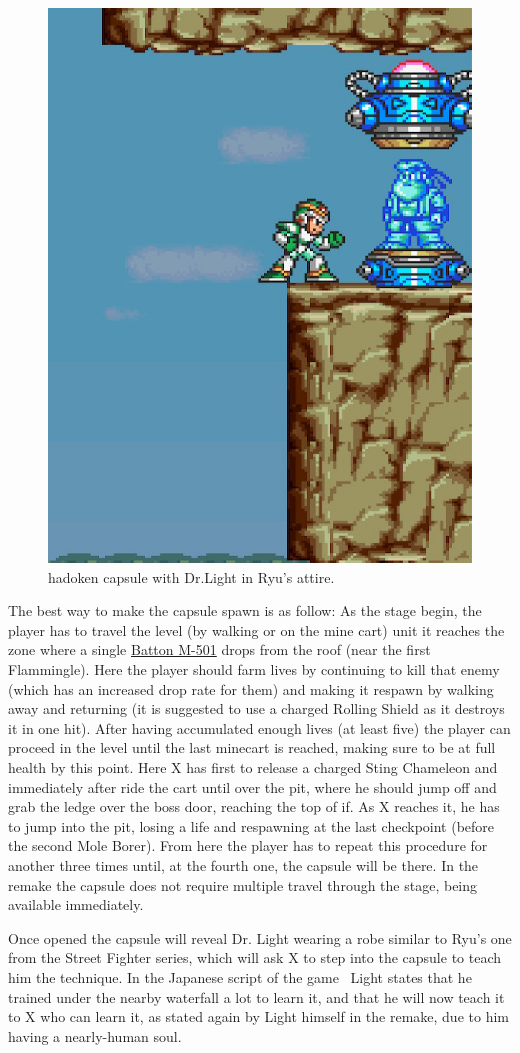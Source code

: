 \begin{figure}[htp]
	\centering
	\includegraphics[width=0.3\linewidth]{figures/X1/Armored_armadillo/Armadillo_hadoken.jpg}
	\caption{hadoken capsule with Dr.Light in Ryu's attire.}
\end{figure}
The best way to make the capsule spawn is as follow: As the stage begin, the player has to travel the level (by walking or on the mine cart) unit it reaches the zone where a single \hyperlink{enem:Batton_M-501}{Batton M-501} drops from the roof (near the first Flammingle). Here the player should farm lives by continuing to kill that enemy (which has an increased drop rate for them)  and making it respawn by walking away and returning (it is suggested to use a charged Rolling Shield as it destroys it in one hit). After having accumulated enough lives (at least five) the player can proceed in the level until the last minecart is reached, making sure to be at full health by this point. Here X has first to release a charged Sting Chameleon and immediately after ride the cart until over the pit, where he should jump off and grab the ledge over the boss door, reaching the top of if. As X reaches it, he has to jump into the pit, losing a life and respawning at the last checkpoint (before the second Mole Borer). From here the player has to repeat this procedure for another three times until, at the  fourth one, the capsule will be there. In the remake the capsule does not require multiple travel through the stage, being available immediately.

Once opened the capsule will reveal Dr. Light wearing a robe similar to Ryu's one from the Street Fighter series, which will ask X to step into the capsule to teach him the technique. In the Japanese  script of the game~\cite{wordpress:X_japanese_script} Light states that he trained under the nearby waterfall a lot to learn it, and that he will now teach it to X who can learn it, as stated again by Light himself in the remake, due to him having a nearly-human soul.


